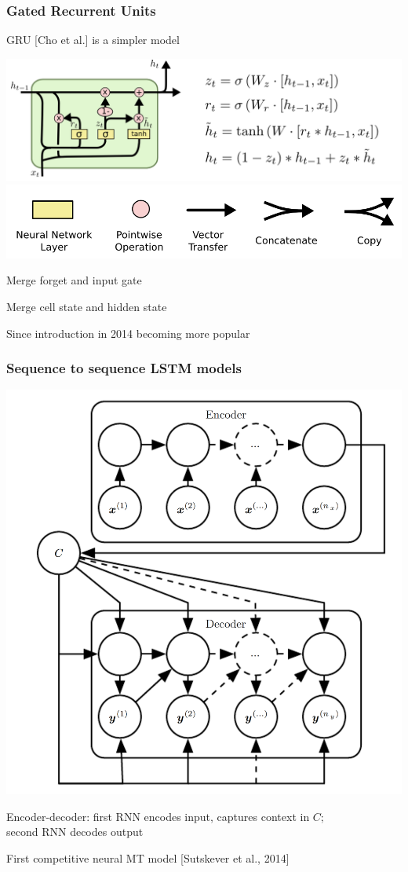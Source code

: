 \documentclass[xcolor=dvipsnames]{beamer}
\begin{document}
\begin{frame}
  \frametitle{Gated Recurrent Units}
  \bi
\item GRU [Cho et al.] is a simpler model

 \includegraphics[width=.9\textwidth]{olah-lstm/LSTM3-var-GRU}\\
\includegraphics[width=.5\textwidth]{olah-lstm/LSTM2-notation}
\item Merge forget and input gate
\item Merge cell state and hidden state
\item Since introduction in 2014 becoming more popular
\ei
\end{frame}

\begin{frame}
  \frametitle{Sequence to sequence LSTM models}
  \includegraphics[height=.7\textheight]{gcb-rnn-encdec}\raisebox{1em}{[Goodfellow
  et al.]}
\bi
\item Encoder-decoder: first RNN encodes input, captures context in
  $C$;\\second RNN decodes
  output
\item First competitive neural MT model [Sutskever et
  al., 2014]
\ei
\end{frame}
\end{document}
